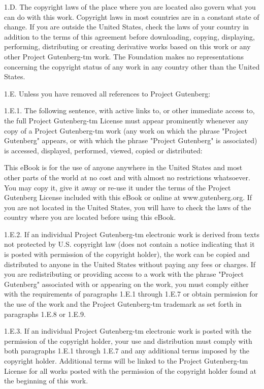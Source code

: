 1.D. The copyright laws of the place where you are located also govern
what you can do with this work. Copyright laws in most countries are
in a constant state of change. If you are outside the United States,
check the laws of your country in addition to the terms of this
agreement before downloading, copying, displaying, performing,
distributing or creating derivative works based on this work or any
other Project Gutenberg-tm work. The Foundation makes no
representations concerning the copyright status of any work in any
country other than the United States.

1.E. Unless you have removed all references to Project Gutenberg:

1.E.1. The following sentence, with active links to, or other
immediate access to, the full Project Gutenberg-tm License must appear
prominently whenever any copy of a Project Gutenberg-tm work (any work
on which the phrase "Project Gutenberg" appears, or with which the
phrase "Project Gutenberg" is associated) is accessed, displayed,
performed, viewed, copied or distributed:

  This eBook is for the use of anyone anywhere in the United States and
  most other parts of the world at no cost and with almost no
  restrictions whatsoever. You may copy it, give it away or re-use it
  under the terms of the Project Gutenberg License included with this
  eBook or online at www.gutenberg.org. If you are not located in the
  United States, you will have to check the laws of the country where
  you are located before using this eBook.

1.E.2. If an individual Project Gutenberg-tm electronic work is
derived from texts not protected by U.S. copyright law (does not
contain a notice indicating that it is posted with permission of the
copyright holder), the work can be copied and distributed to anyone in
the United States without paying any fees or charges. If you are
redistributing or providing access to a work with the phrase "Project
Gutenberg" associated with or appearing on the work, you must comply
either with the requirements of paragraphs 1.E.1 through 1.E.7 or
obtain permission for the use of the work and the Project Gutenberg-tm
trademark as set forth in paragraphs 1.E.8 or 1.E.9.

1.E.3. If an individual Project Gutenberg-tm electronic work is posted
with the permission of the copyright holder, your use and distribution
must comply with both paragraphs 1.E.1 through 1.E.7 and any
additional terms imposed by the copyright holder. Additional terms
will be linked to the Project Gutenberg-tm License for all works
posted with the permission of the copyright holder found at the
beginning of this work.

